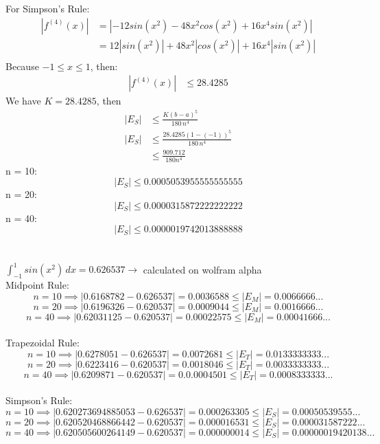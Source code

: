 \documentclass{article}
\begin{document}
    For Simpson's Rule:\\
    \begin{align*}
        |f^{(4)}(x)| &= |-12sin(x^2) - 48x^2cos(x^2) + 16x^4sin(x^2)| \\
        &= 12|sin(x^2)| + 48 x^2 |cos(x^2)| + 16 x^4 |sin(x^2)| \\
    \end{align*}
    Because $-1 \leq x \leq 1$, then:
    \begin{align*}
        |f^{(4)}(x)| & \leq 28.4285
    \end{align*}
    We have $ K = 28.4285$, then
    \begin{align*}
        |E_{S}| & \leq \frac{K(b-a)^5}{180\,n^4} \\
        |E_{S}| & \leq \frac{28.4285(1-(-1))^5}{180\,n^4} \\
        &\leq \frac{909.712}{180n^4}
    \end{align*}
    n = 10: \\
    $$ |E_{S}| \leq 0.0005053955555555555 $$
    n = 20: \\
    $$ |E_{S}| \leq 0.0000315872222222222 $$
    n = 40: \\
    $$ |E_{S}| \leq 0.0000019742013888888 $$ \\\\


    $ \int_{-1}^{1} sin(x^2) \, dx = 0.626537 \to $  calculated on wolfram alpha \\
    
    Midpoint Rule: \\

    $$ n = 10 \implies |0.6168782 - 0.626537| = 0.0036588 \leq |E_M| = 0.0066666... $$
    $$ n = 20 \implies |0.6196326 - 0.620537| = 0.0009044 \leq |E_M| = 0.0016666... $$
    $$ n = 40 \implies |0.62031125 - 0.620537| = 0.00022575 \leq |E_M| = 0.00041666...$$ \\

    Trapezoidal Rule: \\
    $$ n = 10 \implies |0.6278051 - 0.626537| = 0.0072681 \leq |E_T| = 0.0133333333... $$
    $$ n = 20 \implies |0.6223416 - 0.620537| = 0.0018046 \leq |E_T| = 0.0033333333... $$
    $$ n = 40 \implies |0.6209871 - 0.620537| = 0.0.0004501 \leq |E_T| = 0.0008333333...$$ \\

    Simpson's Rule: \\
    $$ n = 10 \implies |0.620273694885053 - 0.626537| = 0.000263305 \leq |E_S| = 0.00050539555... $$
    $$ n = 20 \implies |0.620520468866442 - 0.620537| = 0.000016531 \leq |E_S| = 0.000031587222...$$
    $$ n = 40 \implies |0.620505600264149 - 0.620537| = 0.000000014 \leq |E_S| = 0.00000019420138...$$
\end{document}
